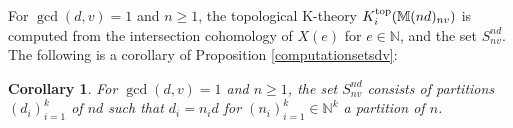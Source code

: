 \documentclass [11pt,oneside,a4paper,mathscr]{amsart}
\newtheorem{cor}[thm]{Corollary}
\theoremstyle{definition}
\renewcommand{\leq}{\leqslant}
\renewcommand{\geq}{\geqslant}
\begin{document}
For $\gcd(d, v)=1$ and $n\geq 1$, the topological 
K-theory 
$K_i^{\rm{top}}(\mathbb{M}(nd)_{nv})$
is computed from the intersection cohomology of $X(e)$ for $e\in\mathbb{N}$, and the set $S_{nv}^{nd}$.
The following is a corollary of Proposition \ref{computationsetsdv}: 
\begin{cor}\label{setSnd}
For $\gcd(d, v)=1$ and $n\geq 1$,
the set $S_{nv}^{nd}$ consists of partitions $(d_i)_{i=1}^k$ of
$nd$ such that $d_i=n_i d$
for $(n_i)_{i=1}^k\in\mathbb{N}^k$ a partition of $n$.
\end{cor}
\end{document}
